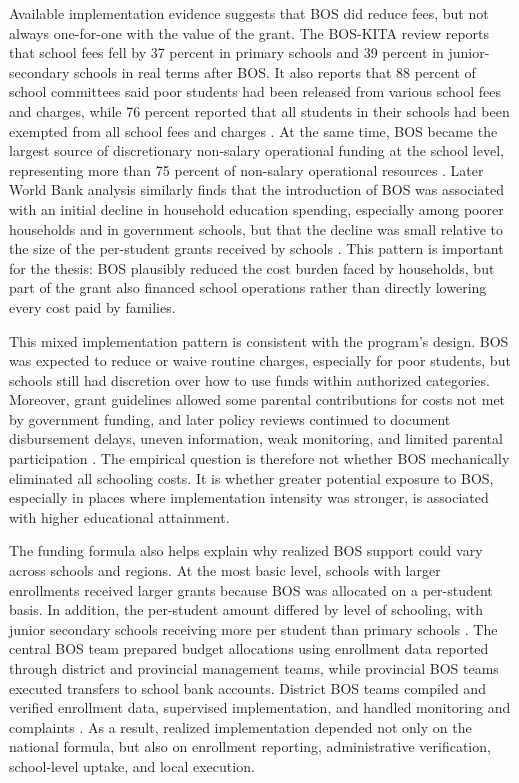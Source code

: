\documentclass[a4paper, 12pt]{article}
\begin{document}
\begin{doublespacing}
Available implementation evidence suggests that BOS did reduce fees, but not always one-for-one with the value of the grant. The BOS-KITA review reports that school fees fell by 37 percent in primary schools and 39 percent in junior-secondary schools in real terms after BOS. It also reports that 88 percent of school committees said poor students had been released from various school fees and charges, while 76 percent reported that all students in their schools had been exempted from all school fees and charges \citep{WorldBank2008}. At the same time, BOS became the largest source of discretionary non-salary operational funding at the school level, representing more than 75 percent of non-salary operational resources \citep{WorldBank2008}. Later World Bank analysis similarly finds that the introduction of BOS was associated with an initial decline in household education spending, especially among poorer households and in government schools, but that the decline was small relative to the size of the per-student grants received by schools \citep{WorldBank2014}. This pattern is important for the thesis: BOS plausibly reduced the cost burden faced by households, but part of the grant also financed school operations rather than directly lowering every cost paid by families.

This mixed implementation pattern is consistent with the program's design. BOS was expected to reduce or waive routine charges, especially for poor students, but schools still had discretion over how to use funds within authorized categories. Moreover, grant guidelines allowed some parental contributions for costs not met by government funding, and later policy reviews continued to document disbursement delays, uneven information, weak monitoring, and limited parental participation \citep{UNESCOIIEPUNICEF2016,WorldBank2014,SMERUUNESCO2024}. The empirical question is therefore not whether BOS mechanically eliminated all schooling costs. It is whether greater potential exposure to BOS, especially in places where implementation intensity was stronger, is associated with higher educational attainment.

The funding formula also helps explain why realized BOS support could vary across schools and regions. At the most basic level, schools with larger enrollments received larger grants because BOS was allocated on a per-student basis. In addition, the per-student amount differed by level of schooling, with junior secondary schools receiving more per student than primary schools \citep{IsdijosoEtAl2006,WorldBank2008}. The central BOS team prepared budget allocations using enrollment data reported through district and provincial management teams, while provincial BOS teams executed transfers to school bank accounts. District BOS teams compiled and verified enrollment data, supervised implementation, and handled monitoring and complaints \citep{WorldBank2008}. As a result, realized implementation depended not only on the national formula, but also on enrollment reporting, administrative verification, school-level uptake, and local execution.


\end{doublespacing}
\end{document}
